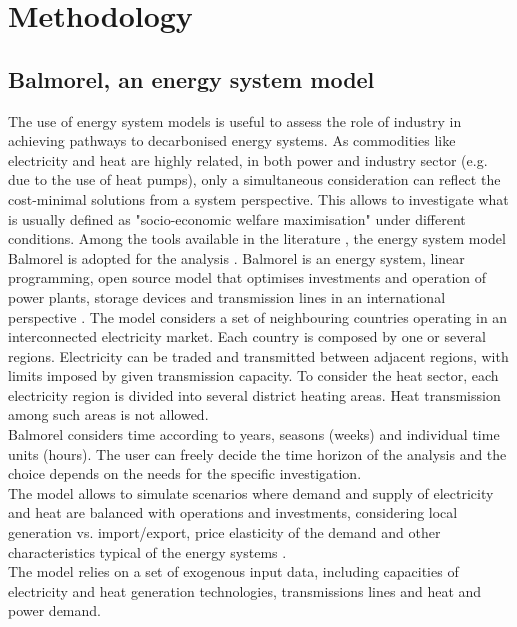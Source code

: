 \documentclass[review]{elsarticle}
\begin{document}

\section{Methodology} \label{meths}

\subsection{Balmorel, an energy system model}

The use of energy system models is useful to assess the role of industry in achieving pathways to decarbonised energy systems. As commodities like electricity and heat are highly related, in both power and industry sector (e.g. due to the use of heat pumps), only a simultaneous consideration can reflect the cost-minimal solutions from a system perspective. This allows to investigate what is usually defined as "socio-economic welfare maximisation" under different conditions. 
Among the tools available in the literature \cite{Connolly2010}, the energy system model Balmorel is adopted for the analysis \cite{balmorel}.
Balmorel is an energy system, linear programming, open source model that optimises investments and operation of power plants, storage devices and transmission lines in an international perspective \cite{Ravn2001}. 
The model considers a set of neighbouring countries operating in an interconnected electricity market. Each country is composed by one or several regions. Electricity can be traded and transmitted between adjacent regions, with limits imposed by given transmission capacity. 
To consider the heat sector, each electricity region is divided into several district heating areas. Heat transmission among such areas is not allowed.  
\\
Balmorel considers time according to years, seasons (weeks) and individual time units (hours). 
The user can freely decide the time horizon of the analysis and the choice depends on the needs for the specific investigation. 
\\
The model allows to simulate scenarios where demand and supply of electricity and heat are balanced with operations and investments, considering local generation vs. import/export, price elasticity of the demand and other characteristics typical of the energy systems \cite{Munster2012}. 
\\
The model relies on a set of exogenous input data, including capacities of electricity and heat generation technologies, transmissions lines and heat and power demand. 
\end{document}
